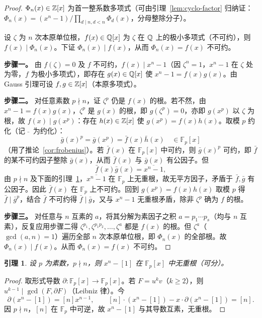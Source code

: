 \documentclass{article}
\theoremstyle{plain}
\newtheorem{lem}[thm]{引理}
\theoremstyle{definition}
\theoremstyle{remark}
\begin{document}
\begin{proof}
  $\Phi_n(x)\in\mathbb{Z}[x]$ 为首一整系数多项式（可由引理~\ref{lem:cyclo-factor} 归纳证：$\Phi_n(x)=(x^n-1)/\prod_{d\mid n,d<n}\Phi_d(x)$，分母整除分子）。

  设 $\zeta$ 为 $n$ 次本原单位根，$f(x)\in\mathbb{Q}[x]$ 为 $\zeta$ 在 $\mathbb{Q}$ 上的极小多项式（不可约），则 $f(x)\mid\Phi_n(x)$。下证 $\Phi_n(x)\mid f(x)$，从而 $\Phi_n(x)=f(x)$ 不可约。

  \textbf{步骤一。} 由 $f(\zeta)=0$ 及 $f$ 不可约，$f(x)\mid x^n-1$（因 $\zeta^n=1$，$x^n-1$ 在 $\zeta$ 处为零，$f$ 为极小多项式），即存在 $g(x)\in\mathbb{Q}[x]$ 使 $x^n-1=f(x)g(x)$。由 Gauss 引理可设 $f,g\in\mathbb{Z}[x]$（本原多项式）。

  \textbf{步骤二。} 对任意素数 $p\nmid n$，证 $\zeta^p$ 仍是 $f(x)$ 的根。若不然，由 $x^n-1=f(x)g(x)$，$\zeta^p$ 是 $g(x)$ 的根，即 $g(\zeta^p)=0$，亦即 $g(x^p)$ 以 $\zeta$ 为根，故 $f(x)\mid g(x^p)$：存在 $h(x)\in\mathbb{Z}[x]$ 使 $g(x^p)=f(x)h(x)$。取模 $p$ 约化（记 $\bar{}\ $ 为约化）：
  \[
    \bar g(x)^p=\bar g(x^p)=\bar f(x)\bar h(x)\quad\in\mathbb{F}_p[x]
  \]
  （用了推论~\ref{cor:frobenius}）。若 $\bar f(x)$ 在 $\mathbb{F}_p[x]$ 中可约，则 $\bar g(x)^p$ 可约，即 $\bar f$ 的某不可约因子整除 $\bar g(x)$，从而 $\bar f(x)$ 与 $\bar g(x)$ 有公因子。但
  \[
    \bar f(x)\bar g(x)=\overline{x^n-1},
  \]
  由 $p\nmid n$ 及下面的引理~\ref{lem:sep}，$\overline{x^n-1}$ 在 $\mathbb{F}_p$ 上无重根，故无平方因子，矛盾于 $\bar f,\bar g$ 有公因子。因此 $\bar f(x)$ 在 $\mathbb{F}_p$ 上不可约。回到 $g(x^p)=f(x)h(x)$ 取模 $p$ 得 $\bar f\mid\bar g^p$，结合 $\bar f$ 不可约得 $\bar f\mid\bar g$，又与 $x^n-1$ 无重根矛盾，除非 $\zeta^p$ 确为 $f$ 的根。

  \textbf{步骤三。} 对任意与 $n$ 互素的 $a$，将其分解为素因子之积 $a=p_1\cdots p_s$（均与 $n$ 互素），反复应用步骤二得 $\zeta^{p_1},\zeta^{p_1p_2},\dots,\zeta^a$ 都是 $f(x)$ 的根。但 $\zeta^a$（$\gcd(a,n)=1$）遍历全部 $n$ 次本原单位根，即 $\Phi_n(x)$ 的全部根。故 $\Phi_n(x)\mid f(x)$。从而 $\Phi_n(x)=f(x)$ 不可约。
\end{proof}

\begin{lem}\label{lem:sep}
  设 $p$ 为素数，$p\nmid n$，则 $x^n-[1]$ 在 $\mathbb{F}_p[x]$ 中无重根（可分）。
\end{lem}

\begin{proof}
  取形式导数 $\partial:\mathbb{F}_p[x]\to\mathbb{F}_p[x]$。若 $F=u^k v$（$k\ge2$），则 $u^{k-1}\mid\gcd(F,\partial F)$（Leibniz 律）。今
  \[
    \partial(x^n-[1])=[n]x^{n-1},\qquad [n]\cdot(x^n-[1])-x\cdot\partial(x^n-[1])=[n].
  \]
  因 $p\nmid n$，$[n]$ 在 $\mathbb{F}_p$ 中可逆，故 $x^n-[1]$ 与其导数互素，无重根。
\end{proof}
\end{document}
